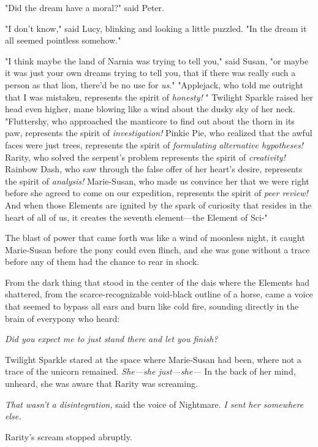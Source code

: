 "Did the dream have a moral?" said Peter.

"I don't know," said Lucy, blinking and looking a little puzzled. "In the dream
it all seemed pointless somehow."

"I think maybe the land of Narnia was trying to tell you," said Susan, "or
maybe it was just your own dreams trying to tell you, that if there was really
such a person as that lion, there'd be no use for \emph{us}."
\sbreak
"Applejack, who told me outright that I was mistaken, represents the spirit
of{\el} \emph{honesty!} " Twilight Sparkle raised her head even higher, mane
blowing like a wind about the dusky sky of her neck. "Fluttershy, who
approached the manticore to find out about the thorn in its paw, represents the
spirit of{\el} \emph{investigation!} Pinkie Pie, who realized that the awful
faces were just trees, represents the spirit of{\el} \emph{formulating
alternative hypotheses!} Rarity, who solved the serpent's problem represents
the spirit of{\el} \emph{creativity!} Rainbow Dash, who saw through the
false offer of her heart's desire, represents the spirit of{\el}
\emph{analysis!} Marie-Susan, who made us convince her that we were right
before she agreed to come on our expedition, represents the spirit of{\el}
\emph{peer review!} And when those Elements are ignited by the spark of
curiosity that resides in the heart of all of us, it creates the seventh
element—the Element of Sci-"

The blast of power that came forth was like a wind of moonless night, it caught
Marie-Susan before the pony could even flinch, and she was gone without a trace
before any of them had the chance to rear in shock.

From the dark thing that stood in the center of the dais where the Elements had
shattered, from the scarce-recognizable void-black outline of a horse, came a
voice that seemed to bypass all ears and burn like cold fire, sounding directly
in the brain of everypony who heard:

\emph{Did you expect me to just stand there and let you finish?}

Twilight Sparkle stared at the space where Marie-Susan had been, where not a
trace of the unicorn remained. \emph{She—she just—she—} In the back of
her mind, unheard, she was aware that Rarity was screaming.

\emph{That wasn't a disintegration,} said the voice of Nightmare. \emph{I sent
her somewhere else.}

Rarity's scream stopped abruptly.

